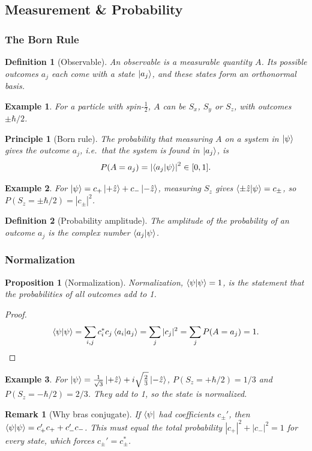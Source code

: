 \documentclass{article}
\newtheorem{principle}{Principle}
\newtheorem{definition}{Definition}
\newtheorem*{example}{Example}
\newtheorem{remark}{Remark}
\newtheorem{proposition}{Proposition}
\begin{document}
\subsection{Measurement \& Probability}
\subsubsection{The Born Rule}
\begin{definition}[Observable]
    An observable is a measurable quantity $A$. Its possible outcomes $a_j$ each come with a state $\ket{a_j}$, and these states form an orthonormal basis.
\end{definition}
\begin{example}
    For a particle with spin-$\tfrac12$, $A$ can be $S_x$, $S_y$ or $S_z$, with outcomes $\pm\hbar/2$.
\end{example}
\begin{principle}[Born rule]
    The probability that measuring $A$ on a system in $\ket{\psi}$ gives the outcome $a_j$, i.e.\ that the system is found in $\ket{a_j}$, is
    \begin{equation}
        P(A = a_j) = \left|\braket{a_j|\psi}\right|^2 \in [0,1].
    \end{equation}
\end{principle}
\begin{example}
    For $\ket{\psi} = c_+\ket{+\hat{z}} + c_-\ket{-\hat{z}}$, measuring $S_z$ gives $\braket{\pm\hat{z}|\psi} = c_\pm$, so $P(S_z = \pm\hbar/2) = |c_\pm|^2$.
\end{example}
\begin{definition}[Probability amplitude]
    The amplitude of the probability of an outcome $a_j$ is the complex number $\braket{a_j|\psi}$.
\end{definition}

\subsubsection{Normalization}
\begin{proposition}[Normalization]
    Normalization, $\braket{\psi|\psi} = 1$, is the statement that the probabilities of all outcomes add to 1.
\end{proposition}
\begin{proof}
    \[\braket{\psi|\psi} = \sum_{i,j}c_i^*c_j\braket{a_i|a_j} = \sum_j|c_j|^2 = \sum_j P(A = a_j) = 1.\]
\end{proof}
\begin{example}
    For $\ket{\psi} = \frac{1}{\sqrt{3}}\ket{+\hat{z}} + i\sqrt{\frac{2}{3}}\ket{-\hat{z}}$, $P(S_z = +\hbar/2) = 1/3$ and $P(S_z = -\hbar/2) = 2/3$. They add to 1, so the state is normalized.
\end{example}
\begin{remark}[Why bras conjugate]
    \label{rem:why-conjugate}
    If $\bra{\psi}$ had coefficients $c_\pm'$, then $\braket{\psi|\psi} = c_+'c_+ + c_-'c_-$. This must equal the total probability $|c_+|^2 + |c_-|^2 = 1$ for every state, which forces $c_\pm' = c_\pm^*$.
\end{remark}
\end{document}
